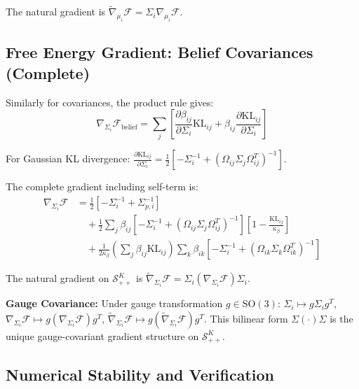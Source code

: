 \documentclass[11pt]{article}
\begin{document}
The natural gradient is $\tilde{\nabla}_{\mu_i} \mathcal{F} = \Sigma_i \nabla_{\mu_i} \mathcal{F}$.

\subsection*{Free Energy Gradient: Belief Covariances (Complete)}

Similarly for covariances, the product rule gives:
\begin{equation}
\nabla_{\Sigma_i} \mathcal{F}_{\mathrm{belief}} = \sum_j \left[ \frac{\partial \beta_{ij}}{\partial \Sigma_i} \mathrm{KL}_{ij} + \beta_{ij} \frac{\partial \mathrm{KL}_{ij}}{\partial \Sigma_i} \right]
\end{equation}

For Gaussian KL divergence: $\frac{\partial \mathrm{KL}_{ij}}{\partial \Sigma_i} = \frac{1}{2}[-\Sigma_i^{-1} + (\Omega_{ij}\Sigma_j\Omega_{ij}^T)^{-1}]$.

The complete gradient including self-term is:
\begin{align}
\nabla_{\Sigma_i} \mathcal{F} &= \frac{1}{2}\left[-\Sigma_i^{-1} + \Sigma_{p,i}^{-1}\right] \nonumber \\
&\quad + \frac{1}{2}\sum_j \beta_{ij} \left[-\Sigma_i^{-1} + (\Omega_{ij}\Sigma_j\Omega_{ij}^T)^{-1}\right]\left[1 - \frac{\mathrm{KL}_{ij}}{\kappa_\beta}\right] \nonumber \\
&\quad + \frac{1}{2\kappa_\beta}\left(\sum_j \beta_{ij}\mathrm{KL}_{ij}\right) \sum_k \beta_{ik} \left[-\Sigma_i^{-1} + (\Omega_{ik}\Sigma_k\Omega_{ik}^T)^{-1}\right]
\end{align}

The natural gradient on $\mathcal{S}_{++}^K$ is $\tilde{\nabla}_{\Sigma_i} \mathcal{F} = \Sigma_i (\nabla_{\Sigma_i} \mathcal{F}) \Sigma_i$.

\textbf{Gauge Covariance:} Under gauge transformation $g \in \mathrm{SO}(3)$: $\Sigma_i \mapsto g\Sigma_i g^T$, $\nabla_{\Sigma_i} \mathcal{F} \mapsto g(\nabla_{\Sigma_i} \mathcal{F})g^T$, $\tilde{\nabla}_{\Sigma_i} \mathcal{F} \mapsto g(\tilde{\nabla}_{\Sigma_i} \mathcal{F})g^T$. This bilinear form $\Sigma (\cdot) \Sigma$ is the unique gauge-covariant gradient structure on $\mathcal{S}_{++}^K$.

\subsection*{Numerical Stability and Verification}
\end{document}
